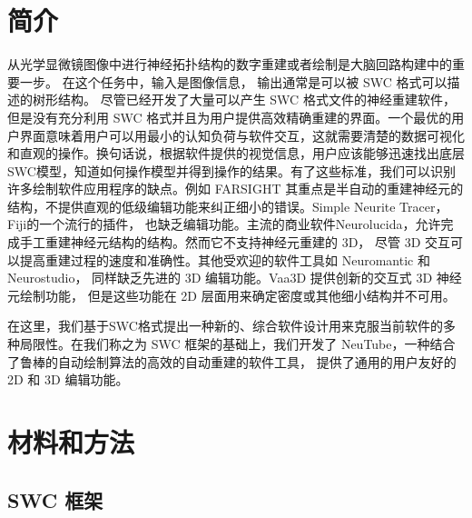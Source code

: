 {\section{简介}
从光学显微镜图像中进行神经拓扑结构的数字重建或者绘制是大脑回路构建中的重要一步。 在这个任务中，输入是图像信息， 输出通常是可以被 SWC 格式可以描述的树形结构。 尽管已经开发了大量可以产生 SWC 格式文件的神经重建软件，但是没有充分利用 SWC 格式并且为用户提供高效精确重建的界面。一个最优的用户界面意味着用户可以用最小的认知负荷与软件交互，这就需要清楚的数据可视化和直观的操作。换句话说，根据软件提供的视觉信息，用户应该能够迅速找出底层SWC模型，知道如何操作模型并得到操作的结果。有了这些标准，我们可以识别许多绘制软件应用程序的缺点。例如 FARSIGHT 其重点是半自动的重建神经元的结构，不提供直观的低级编辑功能来纠正细小的错误。Simple Neurite Tracer，Fiji的一个流行的插件， 也缺乏编辑功能。主流的商业软件Neurolucida，允许完成手工重建神经元结构的结构。然而它不支持神经元重建的 3D， 尽管 3D 交互可以提高重建过程的速度和准确性。其他受欢迎的软件工具如 Neuromantic 和 Neurostudio， 同样缺乏先进的 3D 编辑功能。Vaa3D 提供创新的交互式 3D 神经元绘制功能， 但是这些功能在 2D 层面用来确定密度或其他细小结构并不可用。

在这里，我们基于SWC格式提出一种新的、综合软件设计用来克服当前软件的多种局限性。在我们称之为 SWC 框架的基础上，我们开发了 NeuTube，一种结合了鲁棒的自动绘制算法的高效的自动重建的软件工具， 提供了通用的用户友好的 2D 和 3D 编辑功能。

\section{材料和方法}

\subsection{SWC 框架}

}
